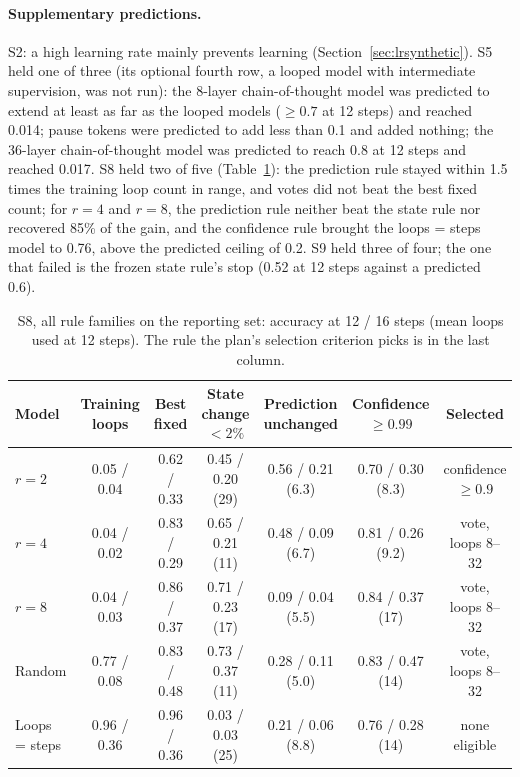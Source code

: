 \paragraph{Supplementary predictions.} S2: a high learning rate mainly prevents learning (Section~\ref{sec:lrsynthetic}).
S5 held one of three (its optional fourth row, a looped model with
intermediate supervision, was not run): the 8-layer chain-of-thought model was predicted to extend at least as far as the looped models
($\geq 0.7$ at 12 steps) and reached 0.014; pause tokens were predicted to add less than 0.1 and added nothing; the
36-layer chain-of-thought model was predicted to reach 0.8 at 12 steps and reached 0.017. S8 held two of five
(Table~\ref{tab:s8}): the prediction rule stayed within 1.5 times the training loop count in range, and votes did not beat the
best fixed count; for $r = 4$ and $r = 8$, the prediction rule neither beat the state rule nor
recovered 85\% of the gain, and the confidence rule
brought the loops = steps model to 0.76, above the predicted ceiling of 0.2. S9 held three of four; the one that failed is the frozen state rule's stop (0.52 at 12 steps
against a predicted 0.6).

\begin{table}[h]
  \centering
  \caption{S8, all rule families on the reporting set: accuracy at 12 / 16 steps (mean loops used at 12 steps). The
  rule the plan's selection criterion picks is in the last column.}
  \label{tab:s8}
  \footnotesize
  \setlength{\tabcolsep}{3pt}
  \begin{tabular}{lcccccc}
    \toprule
    Model & Training loops & Best fixed & State change $<2\%$ & Prediction unchanged & Confidence $\geq 0.99$ & Selected \\
    \midrule
    $r=2$ & 0.05 / 0.04 & 0.62 / 0.33 & 0.45 / 0.20 (29) & 0.56 / 0.21 (6.3) & 0.70 / 0.30 (8.3) & confidence $\geq 0.9$ \\
    $r=4$ & 0.04 / 0.02 & 0.83 / 0.29 & 0.65 / 0.21 (11) & 0.48 / 0.09 (6.7) & 0.81 / 0.26 (9.2) & vote, loops 8--32 \\
    $r=8$ & 0.04 / 0.03 & 0.86 / 0.37 & 0.71 / 0.23 (17) & 0.09 / 0.04 (5.5) & 0.84 / 0.37 (17) & vote, loops 8--32 \\
    Random & 0.77 / 0.08 & 0.83 / 0.48 & 0.73 / 0.37 (11) & 0.28 / 0.11 (5.0) & 0.83 / 0.47 (14) & vote, loops 8--32 \\
    Loops = steps & 0.96 / 0.36 & 0.96 / 0.36 & 0.03 / 0.03 (25) & 0.21 / 0.06 (8.8) & 0.76 / 0.28 (14) & none eligible \\
    \bottomrule
  \end{tabular}
\end{table}


